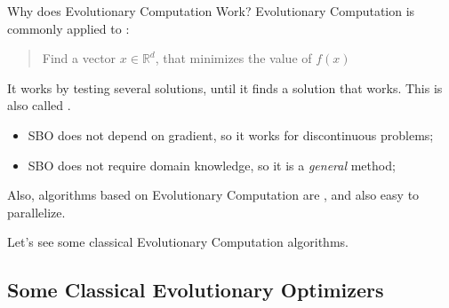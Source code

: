 \documentclass[aspectratio=169]{beamer}
\begin{document}
\begin{frame}{Why does Evolutionary Computation Work?}
  Evolutionary Computation is commonly applied to :
  \begin{quote}
  Find a vector $x \in \mathbb{R}^d$, that minimizes the value of $f(x)$
  \end{quote}\bigskip

  It works by testing several solutions, until it finds a solution that works. This is also called .

  \begin{itemize}
    \item SBO does not depend on gradient, so it works for discontinuous problems;
    \item SBO does not require domain knowledge, so it is a \emph{general} method;
  \end{itemize}\bigskip

  Also, algorithms based on Evolutionary Computation are , and also easy to parallelize.\medskip

  Let's see some classical Evolutionary Computation algorithms.
\end{frame}




\subsection{Some Classical Evolutionary Optimizers}
\end{document}
